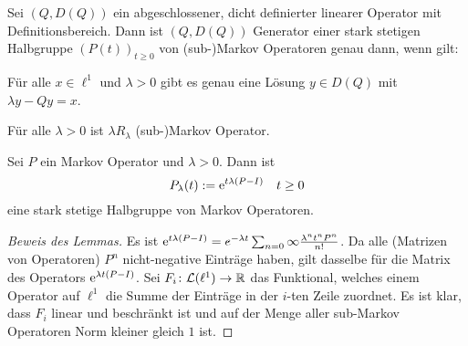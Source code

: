 \documentclass[a4paper]{paper}
\numberwithin{equation}{satz}
\begin{document}
\begin{comment}
\begin{prop}
  Sei $(P(t))_{t\geq0}$ stark stetige Halbgruppe von Markov Operatoren mit Generator $(Q, D(Q))$. Dann ist $\lambda -Q$ für alle $\lambda >0$ invertierbar mit $$(\lambda -Q)^{-1}x=R_\lambda x=\int_0^\infty e^{-\lambda t}P(t)x\text dt,\quad x\in \ell^1,\lambda >0.$$
\end{prop}

\begin{proof}
Es gilt $$e^{-\lambda t}P(t)x-x+\lambda\int_0^t e^{-\lambda t}P(s)x\text dt=Q\int_0^t e^{-\lambda s}P(s)x\text ds,$$ d.h. $\int_0^t e^{-\lambda s}P(s)x\text ds$ ist Element von $D(Q)$. Mit $t\to \infty$ konvergiert dieses zu $R_\lambda x$ und die linke Seite zu $\lambda R_\lambda x-x$, da $\|e^{-\lambda t}P(t)x\|\leq e^{-\lambda t}\|x\|\to 0$. Da $Q$ abgeschlossen ist, ist $R_\lambda x\in D(Q)$ und es gilt $$QR_\lambda x=\lambda R_\lambda x-x,$$ d.h. $(\lambda - Q)R_\lambda x=x$. Umgekehrt gilt  für $x\in D(Q)$ die Identität $$e^{-\lambda t}P(t)x-x+\lambda \int_0^t e^{-\lambda t}P(s)x\text dt=\int_0^t e^{-\lambda s}P(s)Qx\text ds.$$ Mit $t\to\infty$ erhalten wir dann $\lambda R_\lambda x-x=R_\lambda Qx$, d.h. $R_\lambda (\lambda -Q)x=x$. 
\end{proof}
\end{comment}

\begin{satz}
  Sei $(Q, D(Q))$ ein abgeschlossener, dicht definierter linearer Operator mit Definitionsbereich. Dann ist $(Q,D(Q))$   Generator einer stark stetigen Halbgruppe $(P(t))_{t\geq0}$ von (sub-)Markov Operatoren genau dann, wenn gilt:
  \begin{compactenum}
      \item Für alle $x\in \ell^1$ und $\lambda>0$ gibt es genau eine Lösung $y\in D(Q)$ mit $\lambda y- Qy = x$. 
      \item Für alle $\lambda>0$ ist  $\lambda R_\lambda$  (sub-)Markov Operator. 
  \end{compactenum}
\end{satz}


\begin{lem}
  Sei $P$ ein Markov Operator und $\lambda > 0$. Dann  ist $$P_\lambda(t):=\textnormal  e^{t\lambda(P-I)}\quad t\geq0$$ eine stark stetige Halbgruppe von Markov Operatoren.
\end{lem}

\begin{proof}[Beweis des Lemmas]
  Es ist $\text e^{t\lambda (P-I)}=e^{-\lambda t}\sum_{n=0}\infty\frac{\lambda^n t^n P^n}{n!}$. Da alle (Matrizen von Operatoren) $P^n$ nicht-negative Einträge haben, gilt dasselbe für die Matrix des Operators $\text e^{\lambda t(P-I)}$.  Sei $F_i\colon \mathcal L(\ell^1)\to \mathbb{R}$ das Funktional, welches  einem Operator auf $\ell^1$ die Summe der Einträge in der $i$-ten Zeile zuordnet. Es ist klar, dass $F_i$ linear und beschränkt ist und auf der Menge aller sub-Markov Operatoren Norm kleiner gleich $1$ ist.
\end{proof}
\end{document}
